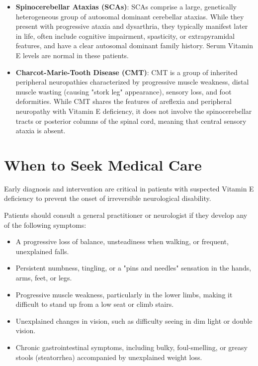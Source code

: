 \begin{itemize}
    \item \textbf{Spinocerebellar Ataxias (SCAs)}: SCAs comprise a large, genetically heterogeneous group of autosomal dominant cerebellar ataxias. While they present with progressive ataxia and dysarthria, they typically manifest later in life, often include cognitive impairment, spasticity, or extrapyramidal features, and have a clear autosomal dominant family history. Serum Vitamin E levels are normal in these patients.
    \item \textbf{Charcot-Marie-Tooth Disease (CMT)}: CMT is a group of inherited peripheral neuropathies characterized by progressive muscle weakness, distal muscle wasting (causing "stork leg" appearance), sensory loss, and foot deformities. While CMT shares the features of areflexia and peripheral neuropathy with Vitamin E deficiency, it does not involve the spinocerebellar tracts or posterior columns of the spinal cord, meaning that central sensory ataxia is absent.
\end{itemize}

\section*{When to Seek Medical Care}
Early diagnosis and intervention are critical in patients with suspected Vitamin E deficiency to prevent the onset of irreversible neurological disability.

Patients should consult a general practitioner or neurologist if they develop any of the following symptoms:
\begin{itemize}
    \item A progressive loss of balance, unsteadiness when walking, or frequent, unexplained falls.
    \item Persistent numbness, tingling, or a "pins and needles" sensation in the hands, arms, feet, or legs.
    \item Progressive muscle weakness, particularly in the lower limbs, making it difficult to stand up from a low seat or climb stairs.
    \item Unexplained changes in vision, such as difficulty seeing in dim light or double vision.
    \item Chronic gastrointestinal symptoms, including bulky, foul-smelling, or greasy stools (steatorrhea) accompanied by unexplained weight loss.
\end{itemize}

